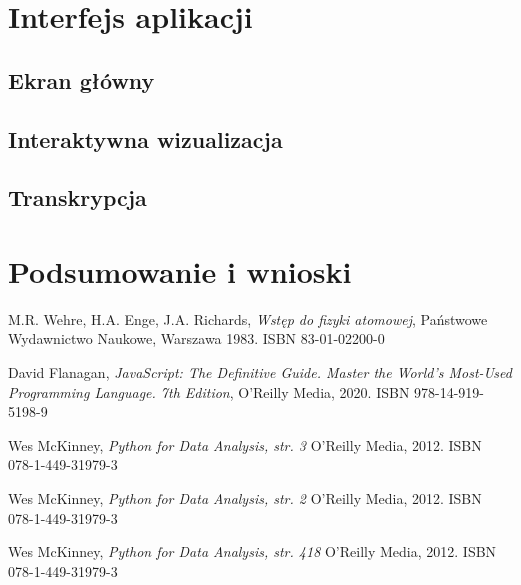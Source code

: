 \documentclass{SGGW-thesis}
\begin{document}
\chapter{Interfejs aplikacji}
	\section{Ekran główny}
	\section{Interaktywna wizualizacja}
	\section{Transkrypcja}
	
\chapter{Podsumowanie i wnioski}


\begin{thebibliography}{9}
	M.R. Wehre, H.A. Enge, J.A. Richards,
	\textit{Wstęp do fizyki atomowej}, 
	Państwowe Wydawnictwo Naukowe, Warszawa 1983. ISBN 83-01-02200-0

	David Flanagan, 
	\textit{JavaScript: The Definitive Guide. Master the World's Most-Used Programming Language. 7th Edition}, 
	O'Reilly Media, 2020. ISBN 978-14-919-5198-9
	
	Wes McKinney,
	\textit{Python for Data Analysis, str. 3}
	O'Reilly Media, 2012. ISBN 078-1-449-31979-3
	
	Wes McKinney,
	\textit{Python for Data Analysis, str. 2}
	O'Reilly Media, 2012. ISBN 078-1-449-31979-3
	
	Wes McKinney,
	\textit{Python for Data Analysis, str. 418}
	O'Reilly Media, 2012. ISBN 078-1-449-31979-3
	
	
	
\end{thebibliography}

\beforelastpage
\end{document}
